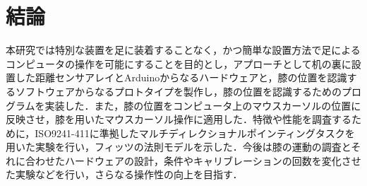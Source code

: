 \chapter{結論}
本研究では特別な装置を足に装着することなく，かつ簡単な設置方法で足によるコンピュータの操作を可能にすることを目的とし，アプローチとして机の裏に設置した距離センサアレイとArduinoからなるハードウェアと，膝の位置を認識するソフトウェアからなるプロトタイプを製作し，膝の位置を認識するためのプログラムを実装した．また，膝の位置をコンピュータ上のマウスカーソルの位置に反映させ，膝を用いたマウスカーソル操作に適用した．特徴や性能を調査するために，ISO9241-411に準拠したマルチディレクショナルポインティングタスクを用いた実験を行い，フィッツの法則モデルを示した．今後は膝の運動の調査とそれに合わせたハードウェアの設計，条件やキャリブレーションの回数を変化させた実験などを行い，さらなる操作性の向上を目指す．